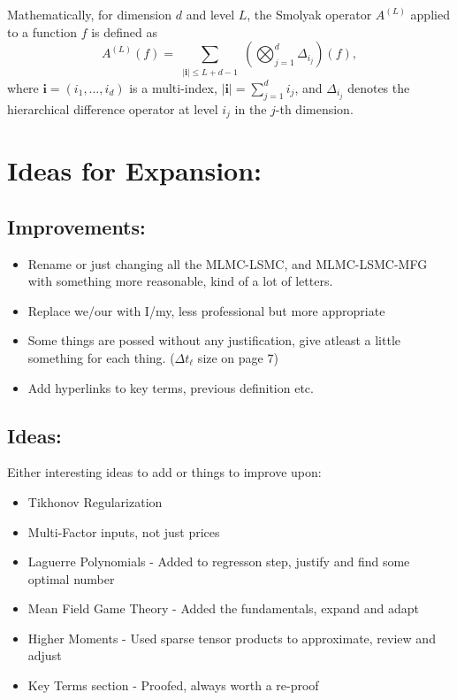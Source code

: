 \documentclass[titlepage]{article}
\begin{document}
\begin{itemize}
    Mathematically, for dimension $d$ and level $L$, the Smolyak operator $A^{(L)}$ applied to a function $f$ is defined as
    \[
    A^{(L)}(f) = \sum_{\substack{|\mathbf{i}| \leq L + d - 1}} \left( \bigotimes_{j=1}^d \Delta_{i_j} \right)(f),
    \]
    where $\mathbf{i} = (i_1, \ldots, i_d)$ is a multi-index, $|\mathbf{i}| = \sum_{j=1}^d i_j$, and $\Delta_{i_j}$ denotes the hierarchical difference operator at level $i_j$ in the $j$-th dimension.

\end{itemize}








\hypertarget{sec:ideas}{\section{Ideas for Expansion:}}
\subsection{Improvements:}
\begin{itemize}
    \item Rename or just changing all the MLMC-LSMC, and MLMC-LSMC-MFG with something more reasonable, kind of a lot of letters.
    \item Replace we/our with I/my, less professional but more appropriate
    \item Some things are possed without any justification, give atleast a little something for each thing. (\(\Delta t_\ell\) size on page 7)
    \item Add hyperlinks to key terms, previous definition etc.
\end{itemize}

\subsection{Ideas:}
Either interesting ideas to add or things to improve upon:
\begin{itemize}
    \item Tikhonov Regularization
    \item Multi-Factor inputs, not just prices
    \item Laguerre Polynomials - Added to regresson step, justify and find some optimal number
    \item Mean Field Game Theory - Added the fundamentals, expand and adapt
    \item Higher Moments - Used sparse tensor products to approximate, review and adjust
    \item Key Terms section - Proofed, always worth a re-proof
\end{itemize}
\end{document}

